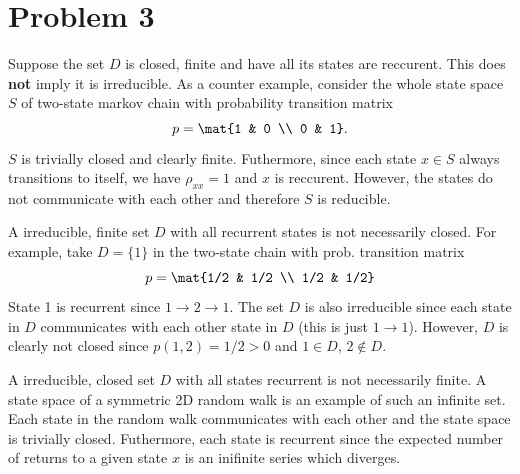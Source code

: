 \documentclass{homework}
\begin{document}
\section{Problem 3}
\begin{letterenum}
\item Suppose the set $D$ is closed, finite and have all its states are reccurent.
This does {\bf not} imply it is irreducible. As a counter example, consider
the whole state space $S$ of two-state markov chain with probability transition matrix
\begin{equation*}
    p = \mat{1 & 0 \\ 0 & 1}.
\end{equation*}
$S$ is trivially closed and clearly finite. Futhermore, since each state
$x \in S$ always transitions to itself, we have $\rho_{xx} = 1$
and $x$ is reccurent.  However, the states do not communicate with each other
and therefore $S$ is reducible.

\item A irreducible, finite set $D$ with all recurrent states is not necessarily
closed. For example, take $D = \{1\}$ in the two-state chain with prob. transition
matrix
\begin{equation*}
    p = \mat{1/2 & 1/2 \\ 1/2 & 1/2}
\end{equation*}
State 1 is recurrent since $1 \to 2 \to 1$. The set $D$ is also irreducible
since each state in $D$ communicates with each other state 
in $D$ (this is just $1\to 1$). However, $D$ is clearly not closed since
$p(1, 2) = 1/2 > 0$ and $1\in D$, $2\notin D$.

\item A irreducible, closed set $D$ with all states recurrent is not necessarily
finite. A state space of a symmetric 2D random walk is an example of such an 
infinite set. Each state in the random walk communicates with each other and 
the state space is trivially closed. Futhermore, each state is recurrent
since the expected number of returns to a given state $x$ is an inifinite
series which diverges.

\end{letterenum}
\end{document}
